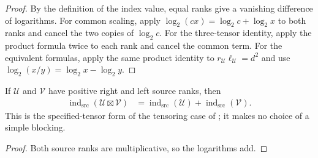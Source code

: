 \begin{proof}\leanok
    By the definition of the index value, equal ranks give a vanishing difference of
    logarithms. For common scaling, apply
    $\log_2(cx)=\log_2c+\log_2x$ to both ranks and cancel the two copies of
    $\log_2c$. For the three-tensor identity, apply the product formula twice
    to each rank and cancel the common term. For the equivalent formulas,
    apply the same product identity to $r_{\mathcal U}\ell_{\mathcal U}=d^2$
    and use $\log_2(x/y)=\log_2x-\log_2y$.
\end{proof}

\begin{lemma}
    \label{thm:mpu_source_index_value_tensor_product}
    \leanok
    If $\mathcal U$ and $\mathcal V$ have positive right and left source
    ranks, then
    \begin{align}
        \operatorname{ind}_{\mathrm{src}}(\mathcal U\boxtimes\mathcal V)
         & =\operatorname{ind}_{\mathrm{src}}(\mathcal U)
        +\operatorname{ind}_{\mathrm{src}}(\mathcal V).
    \end{align}
    This is the specified-tensor form of the tensoring case of
    \cite[Theorem~IV.6(ii)]{Cirac2017MPU}; it makes no choice of a simple
    blocking.
\end{lemma}

\begin{proof}\leanok
    Both source ranks are multiplicative, so the logarithms add.
\end{proof}

